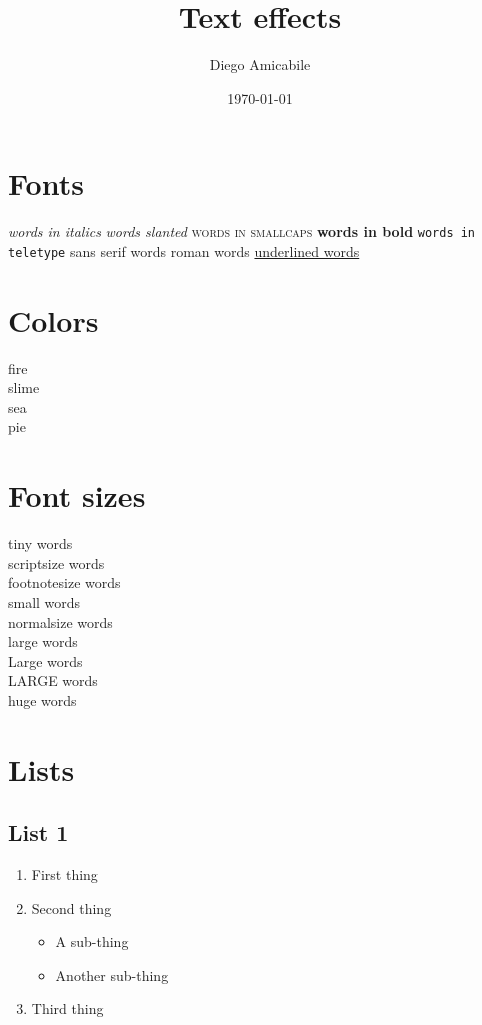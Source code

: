 \documentclass[a4paper,12pt]{article}
\begin{document}
\title{Text effects}
\author{Diego Amicabile}
\date{\today}
\maketitle

\section{Fonts}
\textit{words in italics}
\textsl{words slanted}
\textsc{words in smallcaps}
\textbf{words in bold}
\texttt{words in teletype}    
\textsf{sans serif words}
\textrm{roman words}
\underline{underlined words}
\section{Colors}
{\color{red}fire}
\vspace{12pt}
\\
{\color{green}slime}
\vspace{12pt}
\\
{\color{blue}sea}
\vspace{12pt}
\\
{\color{yellow}pie}
\section{Font sizes}
{\tiny tiny words}
\\
{\scriptsize scriptsize words}
\\
{\footnotesize footnotesize words}
\\
{\small small words}
\\
{\normalsize normalsize words}
\\
{\large large words}
\\
{\Large Large words}
\\
{\LARGE LARGE words}
\\
{\huge huge words}
\section{Lists}
\subsection{List 1}
\begin{enumerate}
\item First thing
\item Second thing
\begin{itemize}
\item A sub-thing
\item Another sub-thing
\end{itemize}
\item Third thing
\end{enumerate}
\end{document}
